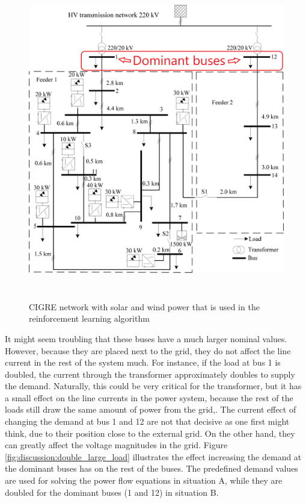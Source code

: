 \documentclass[class=book, crop=false]{standalone}
\begin{document}
\begin{figure}[ht]
    \center
    \includegraphics[height=14cm, width=13.5cm]{figures/cigre_network_dominant.png}
    \caption[size = 9]{CIGRE network with solar and wind power that is used in the reinforcement learning algorithm \cite{cigre}}
    \label{fig:discussion:cigre_network_dominant}
\end{figure}
It might seem troubling that these buses have a much larger nominal values. However, because they are placed next to the grid, they do not affect the line current in the rest of the system much. For instance, if the load at bus 1 is doubled, the current through the transformer approximately doubles to supply the demand. Naturally, this could be very critical for the transformer, but it has a small effect on the line currents in the power system, because the rest of the loads still draw the same amount of power from the grid,. The current effect of changing the demand at bus 1 and 12 are not that decisive as one first might think, due to their position close to the external grid. On the other hand, they can greatly affect the voltage magnitudes in the grid. Figure \ref{fig:discussion:double_large_load} illustrates the effect increasing the demand at the dominant buses has on the rest of the buses. The predefined demand values are used for solving the power flow equations in situation A, while they are doubled for the dominant buses (1 and 12) in situation B.
\end{document}
